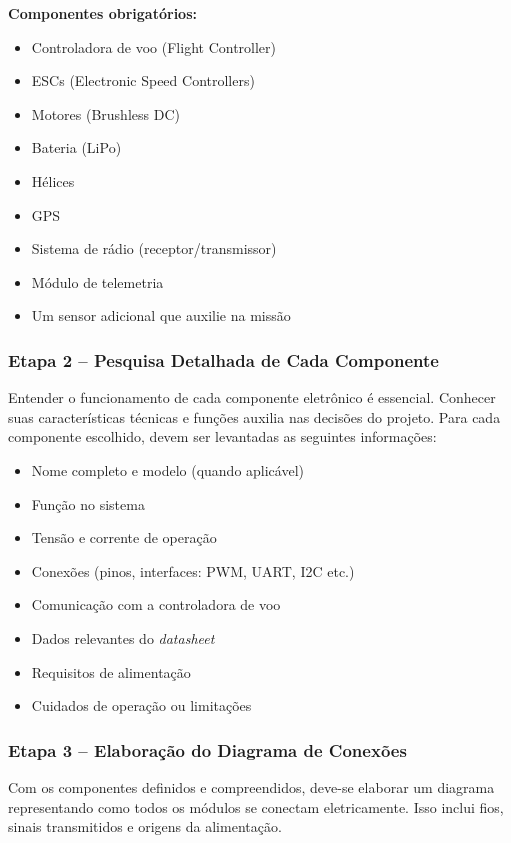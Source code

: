\textbf{Componentes obrigatórios:}
\begin{itemize}
    \item Controladora de voo (Flight Controller)
    \item ESCs (Electronic Speed Controllers)
    \item Motores (Brushless DC)
    \item Bateria (LiPo)
    \item Hélices
    \item GPS
    \item Sistema de rádio (receptor/transmissor)
    \item Módulo de telemetria
    \item Um sensor adicional que auxilie na missão
\end{itemize}

\subsubsection*{Etapa 2 – Pesquisa Detalhada de Cada Componente}

Entender o funcionamento de cada componente eletrônico é essencial. Conhecer suas características técnicas e funções auxilia nas decisões do projeto. Para cada componente escolhido, devem ser levantadas as seguintes informações:

\begin{itemize}
    \item Nome completo e modelo (quando aplicável)
    \item Função no sistema
    \item Tensão e corrente de operação
    \item Conexões (pinos, interfaces: PWM, UART, I2C etc.)
    \item Comunicação com a controladora de voo
    \item Dados relevantes do \textit{datasheet}
    \item Requisitos de alimentação
    \item Cuidados de operação ou limitações
\end{itemize}

\subsubsection*{Etapa 3 – Elaboração do Diagrama de Conexões}

Com os componentes definidos e compreendidos, deve-se elaborar um diagrama representando como todos os módulos se conectam eletricamente. Isso inclui fios, sinais transmitidos e origens da alimentação.

